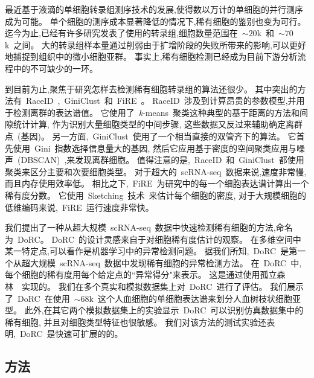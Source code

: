 最近基于液滴的单细胞转录组测序技术的发展,使得数以万计的单细胞的并行测序成为可能。
单个细胞的测序成本显著降低的情况下,稀有细胞的鉴别也变为可行。
迄今为止,已经有许多研究发表了使用的转录组,细胞数量范围在~${\sim} 20$k~和~${\sim} 70$k~之间。
大的转录组样本量通过削弱由于扩增阶段的失败所带来的影响,可以更好地捕捉到组织中的微小细胞亚群。
事实上,稀有细胞检测已经成为目前下游分析流程中的不可缺少的一环。

到目前为止,聚焦于研究怎样去检测稀有细胞转录组的算法还很少。
其中突出的方法有~RaceID~\cite{grun2015single},~GiniClust~\cite{jiang2016giniclust}和~FiRE~\cite{jindal2018discovery}。
RaceID~涉及到计算昂贵的参数模型,并用于检测离群的表达谱值。
它使用了~\textit{k}-means~聚类这种典型的基于距离的方法和间隙统计计算,
作为识别大量细胞类型的中间步骤,
这些数据又反过来辅助确定离群点~(基因)。
另一方面,~GiniClust~使用了一个相当直接的双管齐下的算法。
它首先使用~Gini~指数选择信息量大的基因,
然后它应用基于密度的空间聚类应用与噪声~(DBSCAN)~\cite{ester1996density},来发现离群细胞。
值得注意的是,~RaceID~和~GiniClust~都使用聚类来区分主要和次要细胞类型。
对于超大的~scRNA-seq~数据来说,速度非常慢,而且内存使用效率低。
相比之下,~FiRE~为研究中的每一个细胞表达谱计算出一个稀有度分数。
它使用~Sketching~技术~\cite{wang2007sizing}来估计每个细胞的密度,
对于大规模细胞的低维编码来说,~FiRE~运行速度非常快。

我们提出了一种从超大规模~scRNA-seq~数据中快速检测稀有细胞的方法,命名为~DoRC。
DoRC~的设计灵感来自于对细胞稀有度估计的观察。
在多维空间中某一特定点,可以看作是机器学习中的异常检测问题。
据我们所知,~DoRC~是第一个从超大规模~scRNA-seq~数据中发现稀有细胞的异常检测方法。
在~DoRC~中,每个细胞的稀有度用每个给定点的``异常得分"来表示。
这是通过使用孤立森林~\cite{liu2008isolation}~实现的。
我们在多个真实和模拟数据集上对~DoRC~进行了评估。
我们展示了~DoRC~在使用~${\sim}68$k~这个人血细胞的单细胞表达谱来划分人血树枝状细胞亚型。
此外,在其它两个模拟数据集上的实验显示~DoRC~可以识别仿真数据集中的稀有细胞,
并且对细胞类型特征也很敏感。
我们对该方法的测试实验还表明,~DoRC~是快速可扩展的的。

\subsection{方法}
\label{sec:method}

